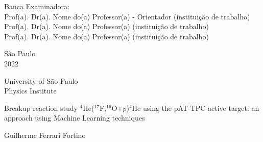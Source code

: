\documentclass[a4paper,12pt,oneside]{book}
\begin{document}
\par
\leftskip 6cm
\par
\leftskip 0cm
\vskip 2cm


\noindent Banca Examinadora: \\
\noindent Prof(a). Dr(a). Nome do(a) Professor(a) - Orientador (institui\c{c}\~{a}o de trabalho) \\
Prof(a). Dr(a). Nome do(a) Professor(a) (institui\c{c}\~{a}o de trabalho) \\
Prof(a). Dr(a). Nome do(a) Professor(a) (institui\c{c}\~{a}o de trabalho) \\
\vspace{1.8cm}


\begin{center}
    {S\~ao Paulo \\  2022}
\end{center}%
\newpage


\newpage
\thispagestyle{empty}
\begin{center}

	{\fontsize{16}{16} \selectfont University of São Paulo \\}
	\vspace{0.1cm}
	{\fontsize{16}{16} \selectfont Physics Institute}
    \vspace{2.2cm}

	{\fontsize{22}{22}\selectfont Breakup reaction study $^4$He($^{17}$F,$^{16}$O+$p$)$^4$He using the pAT-TPC active target: an approach using Machine Learning techniques\par}
    \vspace{2cm}


    {\fontsize{18}{18}\selectfont Guilherme Ferrari Fortino\par}

    \vspace{1.4cm}

\end{center}
\end{document}

